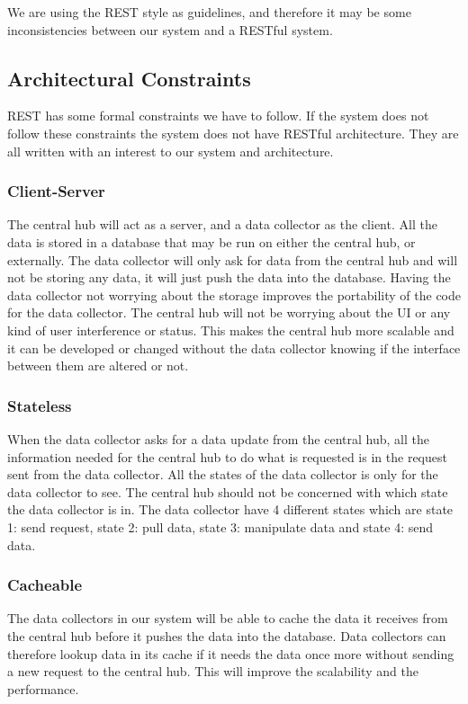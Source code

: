 \documentclass[../document.tex]{subfiles}
\begin{document}
We are using the REST style as guidelines, and therefore it may be some inconsistencies between our system and a RESTful system. 

\subsection{Architectural Constraints}
REST has some formal constraints we have to follow. If the system does not follow these constraints the system does not have RESTful architecture. They are all written with an interest to our system and architecture.

\subsubsection{Client-Server}
The central hub will act as a server, and a data collector as the client. All the data is stored in a database that may be run on either the central hub, or externally. The data collector will only ask for data from the central hub and will not be storing any data, it will just push the data into the database. Having the data collector not worrying about the storage improves the portability of the code for the data collector. The central hub will not be worrying about the UI or any kind of user interference or status. This makes the central hub more scalable and it can be developed or changed without the data collector knowing if the interface between them are altered or not. 

\subsubsection{Stateless}
When the data collector asks for a data update from the central hub, all the information needed for the central hub to do what is requested is in the request sent from the data collector. All the states of the data collector is only for the data collector to see. The central hub should not be concerned with which state the data collector is in. The data collector have 4 different states which are state 1: send request, state 2: pull data, state 3: manipulate data and state 4: send data.

\subsubsection{Cacheable}
The data collectors in our system will be able to cache the data it receives from the central hub before it pushes the data into the database. Data collectors can therefore lookup data in its cache if it needs the data once more without sending a new request to the central hub. This will improve the scalability and the performance. 
\end{document}
